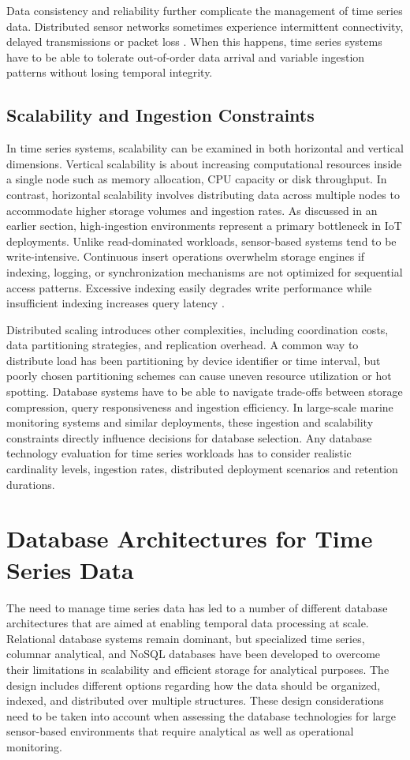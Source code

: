 Data consistency and reliability further complicate the management of time series data. Distributed sensor networks sometimes experience intermittent connectivity, delayed transmissions or packet loss \cite{MAHMOOD2015166}. When this happens, time series systems have to be able to tolerate out-of-order data arrival and variable ingestion patterns without losing temporal integrity.

\subsection{Scalability and Ingestion Constraints}
In time series systems, scalability can be examined in both horizontal and vertical dimensions. Vertical scalability is about increasing computational resources inside a single node such as memory allocation, CPU capacity or disk throughput. In contrast, horizontal scalability involves distributing data across multiple nodes to accommodate higher storage volumes and ingestion rates. As discussed in an earlier section, high-ingestion environments represent a primary bottleneck in IoT deployments. Unlike read-dominated workloads, sensor-based systems tend to be write-intensive. Continuous insert operations overwhelm storage engines if indexing, logging, or synchronization mechanisms are not optimized for sequential access patterns. Excessive indexing easily degrades write performance while insufficient indexing increases query latency \cite{Grzesik2020}.

Distributed scaling introduces other complexities, including coordination costs, data partitioning strategies, and replication overhead. A common way to distribute load has been partitioning by device identifier or time interval, but poorly chosen partitioning schemes can cause uneven resource utilization or hot spotting. Database systems have to be able to navigate trade-offs between storage compression, query responsiveness and ingestion efficiency. In large-scale marine monitoring systems and similar deployments, these ingestion and scalability constraints directly influence decisions for database selection. Any database technology evaluation for time series workloads has to consider realistic cardinality levels, ingestion rates, distributed deployment scenarios and retention durations. 



\section{Database Architectures for Time Series Data}
The need to manage time series data has led to a number of different database architectures that are aimed at enabling temporal data processing at scale. Relational database systems remain dominant, but specialized time series, columnar analytical, and NoSQL databases have been developed to overcome their limitations in scalability and efficient storage for analytical purposes. The design includes different options regarding how the data should be organized, indexed, and distributed over multiple structures. These design considerations need to be taken into account when assessing the database technologies for large sensor-based environments that require analytical as well as operational monitoring. 


